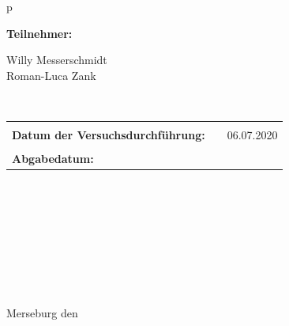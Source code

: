 \begin{center}
\begin{tabular}{p{\textwidth}}

\begin{center}
\Large{\textbf{Teilnehmer:}} \\ 
\end{center}
\begin{center}
\large{Willy Messerschmidt \\
	Roman-Luca Zank} \\
\end{center}


\\

\begin{center}
\begin{tabular}{lll}
&&\\
\large{\textbf{Datum der Versuchsdurchführung:}}&& \large{06.07.2020}\\
&&\\
\large{\textbf{Abgabedatum:}}&& \large{\todayDE}
\end{tabular}
\end{center}

\\ \\ \\ \\ \\ \\ \\ \\ 
\large{Merseburg den \todayDE}

\end{tabular}
\end{center}
